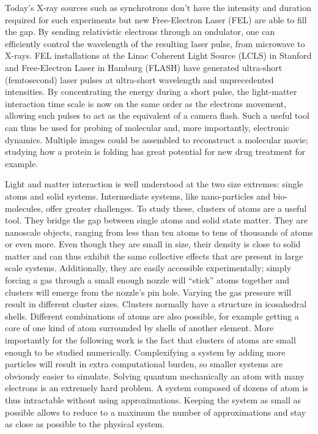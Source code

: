 Today's X-ray sources such as synchrotrons don't have the intensity and 
duration required for such experiments but new Free-Electron Laser (FEL) are 
able to fill the gap. By sending relativistic electrons through an ondulator, 
one can efficiently control the wavelength of the resulting laser pulse, from 
microwave to X-rays. FEL installations at the Linac Coherent Light Source 
(LCLS) in Stanford and Free-Electron Laser in Hamburg (FLASH) have generated 
ultra-short (femtosecond) laser pulses at ultra-short wavelength and 
unprecedented intensities. By concentrating the energy during a short pulse, 
the light-matter interaction time scale is now on the same order as the 
electrons movement, allowing such pulses to act as the equivalent of a camera 
flash. Such a useful tool can thus be used for probing of molecular 
and, more importantly, electronic dynamics. Multiple images could be assembled 
to reconstruct a molecular movie; studying how a protein is folding has great 
potential for new drug treatment for example.

Light and matter interaction is well understood at the two size extremes: 
single atoms and solid systems. Intermediate systems, like nano-particles and 
bio-molecules, offer greater challenges. To study these, clusters of atoms are 
a useful tool. They bridge the gap between single atoms and solid state 
matter. They are nanoscale objects, ranging from less than ten atoms to tens of 
thousands of atoms or even more. Even though they are small in size, their 
density is close to solid matter and can thus exhibit the same collective 
effects that are present in large scale systems. Additionally, they are easily 
accessible experimentally; simply forcing a gas through a small enough nozzle 
will ``stick'' atoms together and clusters will emerge from the nozzle's pin 
hole. Varying the gas pressure will result in different cluster sizes. 
Clusters normally have a structure in icosahedral shells.
Different combinations of atoms are also possible, for example getting a core of 
one kind of atom surrounded by shells of another element. More importantly for 
the following work is the fact that clusters of atoms are small enough to be 
studied numerically. Complexifying a system by adding more particles will 
result in extra computational burden, so smaller systems are obviously easier 
to simulate. Solving quantum mechanically an atom with many electrons is an 
extremely hard problem. A system composed of dozens of atom is thus intractable 
without using approximations. Keeping the system as small as possible allows to 
reduce to a maximum the number of approximations and stay as close as possible 
to the physical system.

